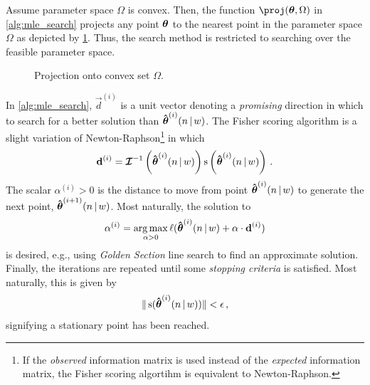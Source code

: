 \documentclass[
    11pt,
    extrafontsizes,
    article,
    oldfontcommands,
    final,
    oneside,
    openany,
    hidelinks]{memoir}
\begin{document}
Assume parameter space $\Omega$ is convex. Then, the function $\proj(\sysparamvec, \Omega)$ in \cref{alg:mle_search} projects any point $\boldsymbol{\mathbf{\theta}}$ to the nearest point in the parameter space $\Omega$ as depicted by \cref{fig:convex_proj}. Thus, the search method is restricted to searching over the feasible parameter space.
\begin{figure}
    \caption{Projection onto convex set $\Omega$.}  
    \centering
    \label{fig:convex_proj}
\end{figure}

In \cref{alg:mle_search}, $\vec{d}^{(i)}$ is a unit vector denoting a \emph{promising} direction in which to search for a better solution than $\boldsymbol{\mathbf{\hat{\boldsymbol{\mathbf{\theta}}}}}^{(i)}(n {\,|\,} w)$. The Fisher scoring algorithm is a slight variation of Newton-Raphson\footnote{If the \emph{observed} information matrix is used instead of the \emph{expected} information matrix, the Fisher scoring algortihm is equivalent to Newton-Raphson.} in which
\begin{equation}
    \boldsymbol{\mathbf{d}}^{(i)} = \operatorname{\boldsymbol{\mathcal{I}}}^{-1}\left(\boldsymbol{\mathbf{\hat{\boldsymbol{\mathbf{\theta}}}}}^{(i)}(n {\,|\,} w) \right) \operatorname{\rm{s}}\left( \boldsymbol{\mathbf{\hat{\boldsymbol{\mathbf{\theta}}}}}^{(i)}(n {\,|\,} w) \right)\,.
\end{equation}
The scalar $\alpha^{(i)} > 0$ is the distance to move from point $\boldsymbol{\mathbf{\hat{\boldsymbol{\mathbf{\theta}}}}}^{(i)}(n {\,|\,} w)$ to generate the next point, $\boldsymbol{\mathbf{\hat{\boldsymbol{\mathbf{\theta}}}}}^{(i+1)}(n {\,|\,} w)$. Most naturally, the solution to
\begin{equation}
    \alpha^{(i)} = \operatorname*{arg\,max}_{\alpha > 0} \ell(\boldsymbol{\mathbf{\hat{\boldsymbol{\mathbf{\theta}}}}}^{(i)}(n {\,|\,} w) + \alpha \cdot \boldsymbol{\mathbf{d}}^{(i)})    
\end{equation}
is desired, e.g., using \emph{Golden Section} line search to find an approximate solution. Finally, the iterations are repeated until some \emph{stopping criteria} is satisfied. Most naturally, this is given by
\begin{equation}
    \| \operatorname{\rm{s}}(\boldsymbol{\mathbf{\hat{\boldsymbol{\mathbf{\theta}}}}}^{(i)}(n {\,|\,} w)) \| < \epsilon\,,
\end{equation}
signifying a stationary point has been reached.
\end{document}
